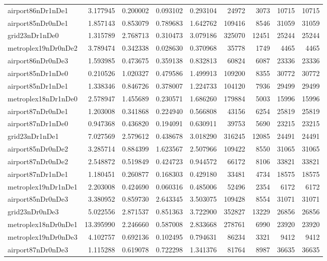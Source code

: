\documentclass[../../../thesis.tex]{subfiles}
\begin{document}
\begin{longtable}{|l|r|r|r|r|r|r|r|r|}
airport86nDr1nDe1 & 3.177945 & 0.200002 & 0.093102 & 0.293104 & 24972 & 3073 & 10715 & 10715 \\
airport85nDr0nDe1 & 1.857143 & 0.853079 & 0.789683 & 1.642762 & 109416 & 8546 & 31059 & 31059 \\
grid23nDr1nDe0 & 1.315789 & 2.768713 & 0.310473 & 3.079186 & 325070 & 12451 & 25244 & 25244 \\
metroplex19nDr0nDe2 & 3.789474 & 0.342338 & 0.028630 & 0.370968 & 35778 & 1749 & 4465 & 4465 \\
airport86nDr0nDe3 & 1.593985 & 0.473675 & 0.359138 & 0.832813 & 60824 & 6087 & 23336 & 23336 \\
airport85nDr1nDe0 & 0.210526 & 1.020327 & 0.479586 & 1.499913 & 109200 & 8355 & 30772 & 30772 \\
airport85nDr1nDe1 & 1.338346 & 0.846726 & 0.378007 & 1.224733 & 104120 & 7936 & 29499 & 29499 \\
metroplex18nDr1nDe0 & 2.578947 & 1.455689 & 0.230571 & 1.686260 & 179884 & 5003 & 15996 & 15996 \\
airport87nDr0nDe1 & 1.203008 & 0.341868 & 0.224940 & 0.566808 & 43156 & 6254 & 25819 & 25819 \\
airport87nDr1nDe0 & 0.947368 & 0.436820 & 0.194091 & 0.630911 & 39753 & 5690 & 23215 & 23215 \\
grid23nDr1nDe1 & 7.027569 & 2.579612 & 0.438678 & 3.018290 & 316245 & 12085 & 24491 & 24491 \\
airport85nDr0nDe2 & 3.285714 & 0.884399 & 1.623567 & 2.507966 & 109422 & 8550 & 31065 & 31065 \\
airport87nDr0nDe2 & 2.548872 & 0.519849 & 0.424723 & 0.944572 & 66172 & 8106 & 33821 & 33821 \\
airport87nDr1nDe1 & 1.180451 & 0.260877 & 0.168303 & 0.429180 & 33481 & 4734 & 18575 & 18575 \\
metroplex19nDr1nDe1 & 2.203008 & 0.424690 & 0.060316 & 0.485006 & 52496 & 2354 & 6172 & 6172 \\
airport85nDr0nDe3 & 3.380952 & 0.859730 & 2.643345 & 3.503075 & 109428 & 8554 & 31071 & 31071 \\
grid23nDr0nDe3 & 5.022556 & 2.871537 & 0.851363 & 3.722900 & 352827 & 13229 & 26856 & 26856 \\
metroplex18nDr0nDe1 & 13.395990 & 2.246660 & 0.587008 & 2.833668 & 278761 & 6990 & 23920 & 23920 \\
metroplex19nDr0nDe3 & 4.102757 & 0.692136 & 0.102495 & 0.794631 & 86234 & 3321 & 9412 & 9412 \\
airport87nDr0nDe3 & 1.115288 & 0.619078 & 0.722298 & 1.341376 & 81764 & 8987 & 36635 & 36635 \\

\end{longtable}
\end{document}
